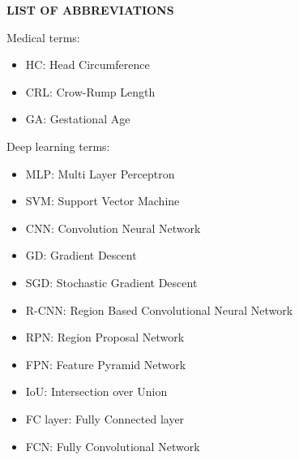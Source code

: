 %
%




\newpage	
\vspace{5cm} 

\begin{center}
	{
		\fontsize{16pt}{1}\selectfont
		\textbf{LIST OF ABBREVIATIONS}
	}
\end{center} 

Medical terms:
\begin{itemize}
	\item HC: Head Circumference
	\item CRL: Crow-Rump Length
	\item GA: Gestational Age
\end{itemize}

Deep learning terms:
\begin{itemize}
	\item MLP: Multi Layer Perceptron
	\item SVM: Support Vector Machine
	\item CNN: Convolution Neural Network
	\item GD: Gradient Descent
	\item SGD: Stochastic Gradient Descent
	\item R-CNN: Region Based Convolutional Neural Network
	\item RPN: Region Proposal Network
	\item FPN: Feature Pyramid Network
	\item IoU: Intersection over Union
	\item FC layer: Fully Connected layer
	\item FCN: Fully Convolutional Network
\end{itemize}
